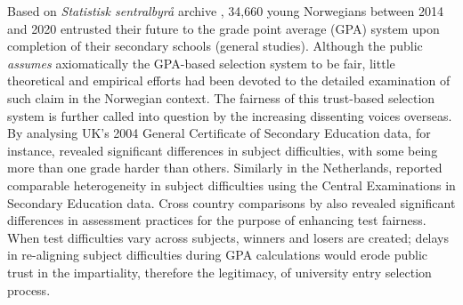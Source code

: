 \documentclass[
    a4paper,            %
    11pt,               %
    stu,                %
    donotrepeattitle,   %
    noextraspace,       %
    floatsintext,       %
    biblatex,           %
    colorlinks=true,        %
    linkcolor=red,          %
    anchorcolor=black,      %
    citecolor=blue,         %
    urlcolor=blue,          %
    bookmarks=true,         %
    bookmarksopen=false,    %
    bookmarksnumbered=true  %
]{apa7}
\begin{document}
Based on \textit{Statistisk sentralbyr{\aa}} archive \parencite{ssb:completion}, 34,660 young Norwegians between 2014 and 2020 entrusted their future to the grade point average (GPA) system upon completion of their secondary schools (general studies). Although the public \emph{assumes} axiomatically the GPA-based selection system to be fair, little theoretical and empirical efforts had been devoted to the detailed examination of such claim in the Norwegian context. The fairness of this trust-based selection system is further called into question by the increasing dissenting voices overseas. By analysing UK's 2004 General Certificate of Secondary Education data, for instance, \textcite{coe:2008} revealed significant differences in subject difficulties, with some being more than one grade harder than others. Similarly in the Netherlands, \textcite{korobko:2008} reported comparable heterogeneity in subject difficulties using the Central Examinations in Secondary Education data. Cross country comparisons by \textcite{lamprianou:2009} also revealed significant differences in assessment practices for the purpose of enhancing test fairness. When test difficulties vary across subjects, winners and losers are created; delays in re-aligning subject difficulties during GPA calculations would erode public trust in the impartiality, therefore the legitimacy, of university entry selection process.

\end{document}
